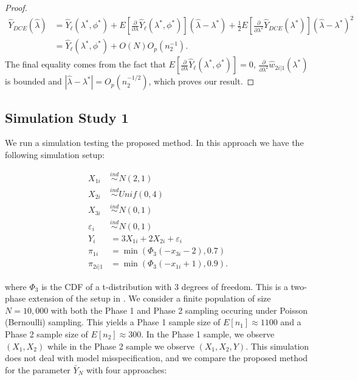 \documentclass[12pt]{article}
\begin{document}
\begin{proof}
  \begin{align*}
    \hat Y_{DCE}(\hat \lambda) 
    &= \hat Y_\ell(\lambda^*, \phi^*) + 
    E\left[\frac{\partial}{\partial \lambda}\hat Y_\ell(\lambda^*,
    \phi^*)\right](\hat \lambda - \lambda^*) + \frac{1}{2}
    E\left[\frac{\partial}{\partial \lambda^2} \hat Y_{DCE}(\lambda^*)\right] (\hat
    \lambda - \lambda^*)^2\\
    &= \hat Y_\ell(\lambda^*, \phi^*) + O(N)O_p(n_2^{-1}).
  \end{align*}
  The final equality comes from the fact that 
  $E\left[\frac{\partial}{\partial \lambda}\hat Y_\ell(\lambda^*, \phi^*)\right]
  = 0$, $\frac{\partial}{\partial \lambda^2} \hat w_{2i|1}(\lambda^*)$ is
  bounded and $|\hat \lambda - \lambda^*| = O_p(n_2^{-1/2})$, which proves our
  result.
\end{proof}

\subsection{Simulation Study 1}

We run a simulation testing the proposed method. In this approach we have the
following simulation setup:

$$
\begin{aligned}
X_{1i} &\stackrel{ind}{\sim} N(2, 1) \\
X_{2i} &\stackrel{ind}{\sim} Unif(0, 4) \\
X_{3i} &\stackrel{ind}{\sim} N(0, 1) \\
\varepsilon_i &\stackrel{ind}{\sim} N(0, 1) \\
Y_{i} &= 3 X_{1i} + 2 X_{2i} + \varepsilon_i \\
\pi_{1i} &= \min(\Phi_3(-x_{3i} - 2), 0.7) \\
\pi_{2i|1} &= \min(\Phi_3(-x_{1i} + 1), 0.9).
\end{aligned}
$$

where $\Phi_3$ is the CDF of a t-distribution with 3 degrees of freedom.
This is a two-phase extension of the setup in \cite{kwon2024debiased}. We
consider a finite population of size $N = 10,000$ with both the Phase 1 and
Phase 2 sampling occuring under Poisson (Bernoulli) sampling. This yields a
Phase 1 sample
size of $E[n_1] \approx 1100$ and a Phase 2 sample size of
$E[n_2] \approx 300$. In the Phase 1 sample, we observe 
$(X_1, X_2)$ while in the Phase 2 sample we observe $(X_1, X_2, Y)$. This
simulation does not deal with model misspecification, and we compare the
proposed method for the parameter $\bar Y_N$ with four approaches:
\end{document}
